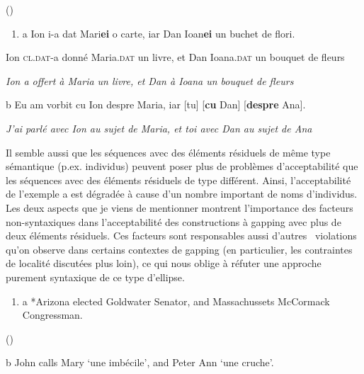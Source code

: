 {\raggedleft
                    (\citet[193]{Winkler2005}) 
}


\begin{enumerate}
\item \label{bkm:Ref289338424}a  Ion i-a dat Mari\textbf{ei} o carte, iar Dan Ioan\textbf{ei} un buchet de flori.


\end{enumerate}
Ion \textsc{cl.dat}-a donné Maria.\textsc{dat} un livre, et Dan Ioana.\textsc{dat} un bouquet de fleurs 

{\itshape
Ion a offert à Maria un livre, et Dan à Ioana un bouquet de fleurs}

  b  Eu am vorbit cu Ion despre Maria, iar [tu] [\textbf{cu} Dan] [\textbf{despre} Ana].

\textit{J'ai parlé avec Ion au sujet de Maria, et toi avec Dan au sujet de Ana}  

Il semble aussi que les séquences avec des éléments résiduels de même type sémantique (p.ex. individus) peuvent poser plus de problèmes d'acceptabilité que les séquences avec des éléments résiduels de type différent. Ainsi, l'acceptabilité de l'exemple a est dégradée à cause d'un nombre important de noms d'individus. Les deux aspects que je viens de mentionner montrent l'importance des facteurs non-syntaxiques dans l'acceptabilité des constructions à gapping avec plus de deux éléments résiduels. Ces facteurs sont responsables aussi d'autres {\guillemotleft}~violations~{\guillemotright} qu'on observe dans certains contextes de gapping (en particulier, les contraintes de localité discutées plus loin), ce qui nous oblige à réfuter une approche purement syntaxique de ce type d'ellipse.  


\begin{enumerate}
\item \label{bkm:Ref289336111}a   *Arizona elected Goldwater Senator, and Massachussets McCormack Congressman.


\end{enumerate}
{\raggedleft
       (\citet[25]{Jackendoff1971})
}

  b  John calls Mary `une imbécile', and Peter Ann `une cruche'.

